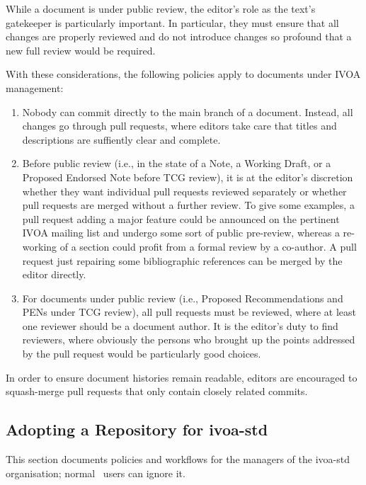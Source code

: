 \documentclass[11pt,a4paper]{ivoa}
\begin{document}
While a document is under public review, the editor's role as the text's
gatekeeper is particularly important.  In particular, they must ensure
that all changes are properly reviewed and do not introduce changes so
profound that a new full review would be required.

With these considerations, the following policies apply to documents
under IVOA management:

\begin{enumerate}
\renewcommand\theenumi{\alph{enumi}}
\item Nobody can commit directly to the main branch of a document.
Instead, all changes go through pull requests, where editors take care
that titles and descriptions are suffiently clear and complete.

\item Before public review (i.e., in the state of a Note, a Working
Draft, or a Proposed Endorsed Note before TCG review), it is at the
editor's discretion whether they want individual pull requests reviewed
separately or whether pull requests are merged without a further review.
To give some examples, a pull request adding a major feature could be
announced on the pertinent IVOA mailing list and undergo some sort of
public pre-review, whereas a re-working of a section could profit from a
formal review by a co-author.  A pull request just repairing some
bibliographic references can be merged by the editor directly.

\item For documents under public review (i.e., Proposed Recommendations
and PENs under TCG review), all pull requests must be reviewed, where at
least one reviewer should be a document author.  It is the editor's duty
to find reviewers, where obviously the persons who brought up the points
addressed by the pull request would be particularly good choices.
\end{enumerate}

In order to ensure document histories remain readable, editors are
encouraged to squash-merge pull requests that only contain closely
related commits.

\subsection{Adopting a Repository for ivoa-std}

This section documents policies and workflows for the managers of the
ivoa-std organisation; normal \ivoatex~users can ignore it.
\end{document}
